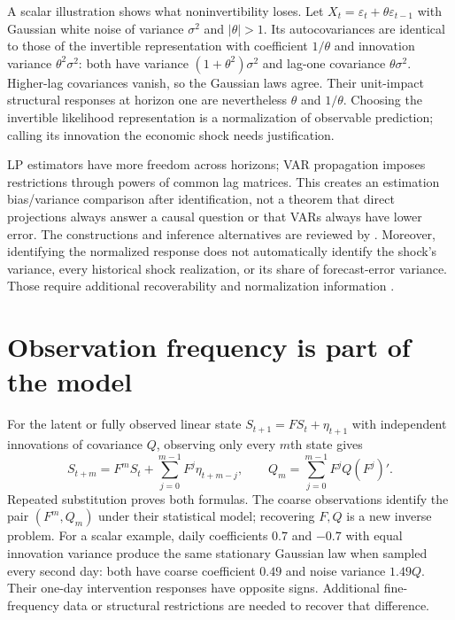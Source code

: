 A scalar illustration shows what noninvertibility loses. Let
$X_t=\varepsilon_t+\theta\varepsilon_{t-1}$ with Gaussian white
noise of variance $\sigma^2$ and $|\theta|>1$. Its autocovariances
are identical to those of the invertible representation with
coefficient $1/\theta$ and innovation variance $\theta^2\sigma^2$:
both have variance $(1+\theta^2)\sigma^2$ and lag-one covariance
$\theta\sigma^2$. Higher-lag covariances vanish, so the Gaussian
laws agree. Their unit-impact structural responses at horizon one
are nevertheless $\theta$ and $1/\theta$. Choosing the invertible
likelihood representation is a normalization of observable prediction;
calling its innovation the economic shock needs justification.

LP estimators have more freedom across horizons; VAR propagation
imposes restrictions through powers of common lag matrices. This
creates an estimation bias/variance comparison after identification,
not a theorem that direct projections always answer a causal question
or that VARs always have lower error. The constructions and inference
alternatives are reviewed by \citet[Sections 2 and 6]{jorda2024}.
Moreover, identifying the normalized response does not automatically
identify the shock's variance, every historical shock realization,
or its share of forecast-error variance. Those require additional
recoverability and normalization information \citep[Section 2.5]{stock2018}.

\section{Observation frequency is part of the model}
\label{r3:temporal-observation}
For the latent or fully observed linear state
$S_{t+1}=FS_t+\eta_{t+1}$ with independent innovations of covariance
$Q$, observing only every $m$th state gives
\begin{equation}
 S_{t+m}=F^mS_t+\sum_{j=0}^{m-1}F^j\eta_{t+m-j},\qquad
 Q_m=\sum_{j=0}^{m-1}F^jQ(F^j)'.
 \label{r3:subsample}
\end{equation}
Repeated substitution proves both formulas. The coarse observations
identify the pair $(F^m,Q_m)$ under their statistical model; recovering
$F,Q$ is a new inverse problem. For a scalar example, daily
coefficients $0.7$ and $-0.7$ with equal innovation variance produce
the same stationary Gaussian law when sampled every second day:
both have coarse coefficient $0.49$ and noise variance $1.49Q$.
Their one-day intervention responses have opposite signs. Additional
fine-frequency data or structural restrictions are needed to recover
that difference.

